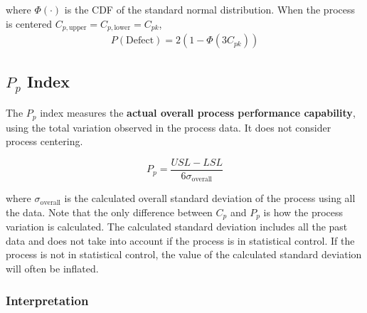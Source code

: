 \documentclass[twoside]{book}
\begin{document}
where \(\Phi(\cdot)\) is the CDF of the standard normal distribution. When the process is centered $C_{p, \text{upper}} = C_{p, \text{lower}}=C_{pk}$,
\begin{align*}
P(\text{Defect}) =2\left( 1 - \Phi\left(3C_{pk}\right)\right)
\end{align*}



\subsection{$P_{p}$ Index}

The $P_{p}$ index measures the \textbf{actual overall process performance capability}, using the total variation observed in the process data. It does not consider process centering.

\begin{textbox}
$$P_{p} = \frac{USL - LSL}{6\sigma_{\text{overall}}}$$
\end{textbox}

where $\sigma_{\text{overall}}$ is the calculated overall standard deviation of the process using all the data. Note that the only difference between $ C_p $ and $ P_p $ is how the process variation is calculated. The calculated standard deviation includes all the past data and does not take into account if the process is in statistical control. If the process is not in statistical control, the value of the calculated standard deviation will often be inflated.
\subsubsection{Interpretation}
\end{document}

